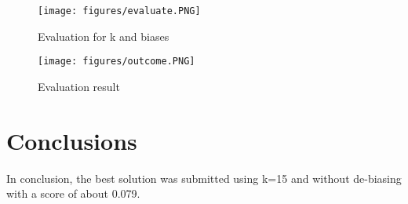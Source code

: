 \documentclass[letterpaper,12pt]{article}
\begin{document}
\begin{figure}[H] 
  \centering
      \texttt{[image: figures/evaluate.PNG]}
        \caption{
                \label{fig:evaluate}  
                Evaluation for k and biases
        }
\end{figure}

\begin{figure}[H] 
  \centering
      \texttt{[image: figures/outcome.PNG]}
        \caption{
                \label{fig:outcome}  
                Evaluation result
        }
\end{figure}

\section{Conclusions}
In conclusion, the best solution was submitted using k=15 and without de-biasing with a score of about 0.079.

{}

\end{document}
